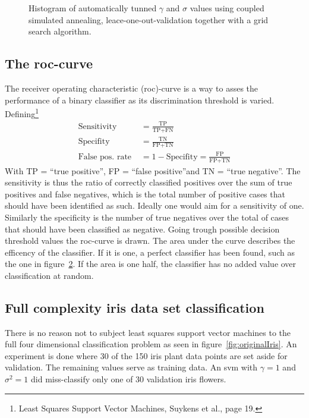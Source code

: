 \begin{figure}
\centering


\caption{Histogram of automatically tunned  $\gamma$ and $\sigma$ values using coupled simulated annealing, leace-one-out-validation together with a grid search algorithm.}
\label{fig:tuneCsaGridLeave}
\end{figure}

\subsection{The roc-curve}
The receiver operating characteristic (roc)-curve is a way to asses the performance of a binary classifier as its discrimination threshold is varied. Defining\footnote{Least Squares Support Vector Machines, Suykens et al., page 19.}
\begin{align}
\text{Sensitivity } &= \frac{\text{TP}}{\text{TP} + \text{FN}} \\ 
\text{Specifity } &= \frac{\text{TN}}{\text{FP} + \text{TN}} \\
\text{False pos. rate } &= 1 - \text{Specifity} = \frac{\text{FP}}{\text{FP} + \text{TN}}
\end{align}
With TP = \textquotedblleft true positive\textquotedblright,
 FP = \textquotedblleft false positive\textquotedblright and
 TN = \textquotedblleft true negative\textquotedblright. The sensitivity is thus the ratio of correctly classified positives over the sum of true positives and false negatives, which is the total number of positive cases that should have been identified as such. Ideally one would aim for a sensitivity of one. Similarly the specificity is the number of true negatives over the total of cases that should have been classified as negative.
Going trough possible decision threshold values the roc-curve is drawn. The area under the curve describes the efficency of the classifier. If it is one, a perfect classifier has been found, such as the one in figure~\ref{fig:roc}. If the area is one half, the classifier has no added value over classification at random.  
 

\begin{figure}
\centering

\caption{}
\label{fig:roc}
\end{figure}


\subsection{Full complexity iris data set classification}
There is no reason not to subject least squares support vector machines to the full four dimensional classification problem as seen in figure~\ref{fig:originalIris}. An experiment is done where 30 of the 150 iris plant data points are set aside for validation. The remaining values serve as training data. An svm with $\gamma = 1$ and $\sigma^2 = 1$ did miss-classify only one of 30 validation iris flowers.